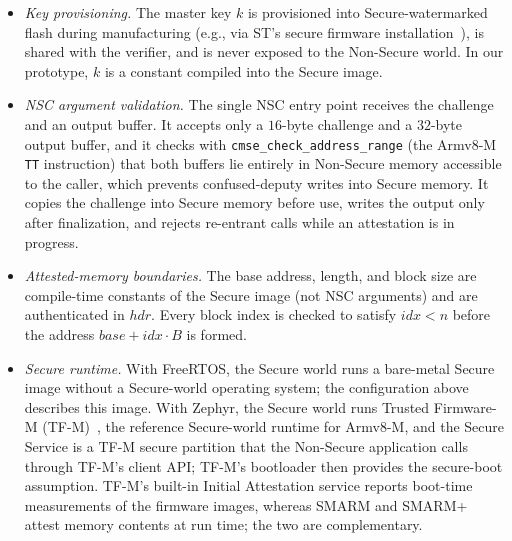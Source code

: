 \documentclass{ieeeaccess}
\newcommand{\rtsmarm}{SMARM+\xspace}
\begin{document}
{\begin{itemize}
  We assume this configuration in deployment; our measurements were taken at RDP level~$0$ to allow debugging, which does not affect runtime.
  \item \emph{Key provisioning.} The master key $k$ is provisioned into Secure-watermarked flash during manufacturing (e.g., via ST's secure firmware installation~\cite{an5347}), is shared with the verifier, and is never exposed to the Non-Secure world.
  In our prototype, $k$ is a constant compiled into the Secure image.
  \item \emph{NSC argument validation.} The single NSC entry point receives the challenge and an output buffer.
  It accepts only a $16$-byte challenge and a $32$-byte output buffer, and it checks with \texttt{cmse\_check\_address\_range} (the Armv8-M \texttt{TT} instruction) that both buffers lie entirely in Non-Secure memory accessible to the caller, which prevents confused-deputy writes into Secure memory.
  It copies the challenge into Secure memory before use, writes the output only after finalization, and rejects re-entrant calls while an attestation is in progress.
  \item \emph{Attested-memory boundaries.} The base address, length, and block size are compile-time constants of the Secure image (not NSC arguments) and are authenticated in $\mathit{hdr}$.
  Every block index is checked to satisfy $idx < n$ before the address $\mathit{base} + idx \cdot B$ is formed.
  \item \emph{Secure runtime.} With FreeRTOS, the Secure world runs a bare-metal Secure image without a Secure-world operating system; the configuration above describes this image.
  With Zephyr, the Secure world runs Trusted Firmware-M (TF-M)~\cite{tfm}, the reference Secure-world runtime for Armv8-M, and the Secure Service is a TF-M secure partition that the Non-Secure application calls through TF-M's client API; TF-M's bootloader then provides the secure-boot assumption.
  TF-M's built-in Initial Attestation service reports boot-time measurements of the firmware images, whereas SMARM and \rtsmarm attest memory contents at run time; the two are complementary.
\end{itemize}}
\end{document}
